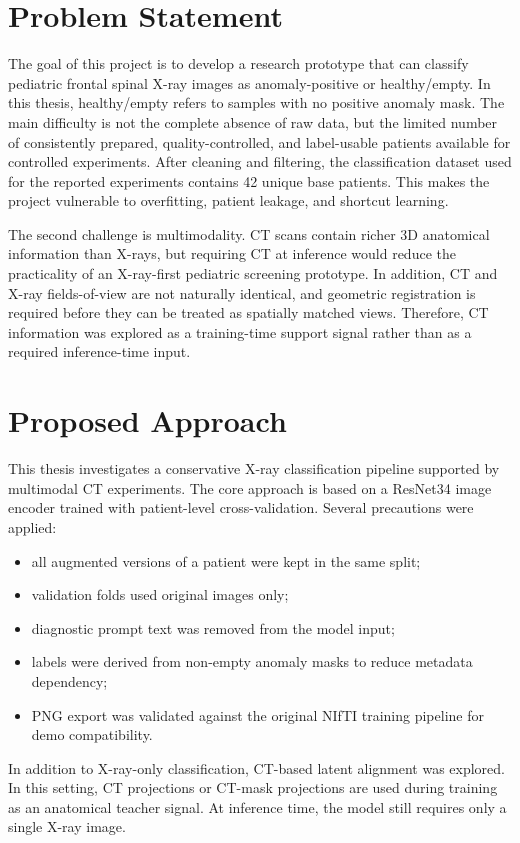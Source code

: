 \section{Problem Statement}
The goal of this project is to develop a research prototype that can classify pediatric frontal spinal X-ray images as anomaly-positive or healthy/empty. In this thesis, healthy/empty refers to samples with no positive anomaly mask. The main difficulty is not the complete absence of raw data, but the limited number of consistently prepared, quality-controlled, and label-usable patients available for controlled experiments. After cleaning and filtering, the classification dataset used for the reported experiments contains 42 unique base patients. This makes the project vulnerable to overfitting, patient leakage, and shortcut learning.

The second challenge is multimodality. CT scans contain richer 3D anatomical information than X-rays, but requiring CT at inference would reduce the practicality of an X-ray-first pediatric screening prototype. In addition, CT and X-ray fields-of-view are not naturally identical, and geometric registration is required before they can be treated as spatially matched views. Therefore, CT information was explored as a training-time support signal rather than as a required inference-time input.

\section{Proposed Approach}
This thesis investigates a conservative X-ray classification pipeline supported by multimodal CT experiments. The core approach is based on a ResNet34 image encoder trained with patient-level cross-validation. Several precautions were applied:
\begin{itemize}
    \item all augmented versions of a patient were kept in the same split;
    \item validation folds used original images only;
    \item diagnostic prompt text was removed from the model input;
    \item labels were derived from non-empty anomaly masks to reduce metadata dependency;
    \item PNG export was validated against the original NIfTI training pipeline for demo compatibility.
\end{itemize}

In addition to X-ray-only classification, CT-based latent alignment was explored. In this setting, CT projections or CT-mask projections are used during training as an anatomical teacher signal. At inference time, the model still requires only a single X-ray image.

